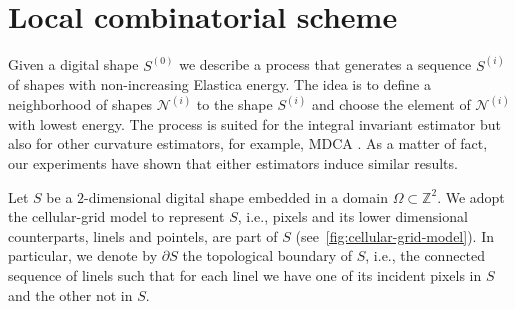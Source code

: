 \section{Local combinatorial scheme}
\label{ch6:sec:local-combinatorial-scheme}

Given a digital shape $S^{(0)}$ we describe a process that generates a
sequence $S^{(i)}$ of shapes with non-increasing Elastica energy. The
idea is to define a neighborhood of shapes $\mathcal{N}^{(i)}$ to the
shape $S^{(i)}$ and choose the element of $\mathcal{N}^{(i)}$ with
lowest energy.  The process is suited for the integral invariant
estimator but also for other curvature estimators, for example, MDCA
\cite{roussillon11mdca}. As a matter of fact, our experiments have
shown that either estimators induce similar results.

Let $S$ be a $2$-dimensional digital shape embedded in a domain $\Omega \subset \mathbb{Z}^2$. We adopt the cellular-grid model to represent $S$, i.e., pixels and its lower dimensional counterparts, linels and pointels, are part of $S$ (see~\cref{fig:cellular-grid-model}). In particular, we denote by $\partial S$ the topological boundary of $S$, i.e., the connected sequence of linels such that for each linel we have one of its incident pixels in $S$ and the other not in $S$.

